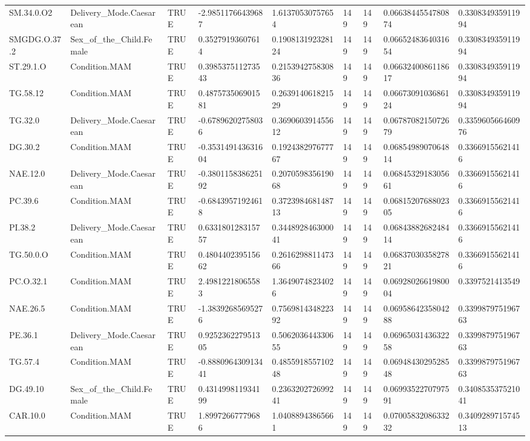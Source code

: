 \begin{longtable}{lllllllll}
SM.34.0.O2 & Delivery\_Mode.Caesarean & TRUE & -2.98511766439687 & 1.61370530757654 & 149 & 149 & 0.0663844554780874 & 0.330834935911994 \\
SMGDG.O.37.2 & Sex\_of\_the\_Child.Female & TRUE & 0.35279193607614 & 0.190813192328124 & 149 & 149 & 0.0665248364031654 & 0.330834935911994 \\
ST.29.1.O & Condition.MAM & TRUE & 0.398537511273543 & 0.215394275830836 & 149 & 149 & 0.0663240086118617 & 0.330834935911994 \\
TG.58.12 & Condition.MAM & TRUE & 0.487573506901581 & 0.263914061821529 & 149 & 149 & 0.0667309103686124 & 0.330834935911994 \\
TG.32.0 & Delivery\_Mode.Caesarean & TRUE & -0.67896202758036 & 0.369060391455612 & 149 & 149 & 0.0678708215072679 & 0.335960566460976 \\
DG.30.2 & Condition.MAM & TRUE & -0.353149143631604 & 0.192438297677767 & 149 & 149 & 0.0685498907064814 & 0.33669155621416 \\
NAE.12.0 & Delivery\_Mode.Caesarean & TRUE & -0.380115838625192 & 0.207059835619068 & 149 & 149 & 0.0684532918305661 & 0.33669155621416 \\
PC.39.6 & Condition.MAM & TRUE & -0.68439571924618 & 0.372398468148713 & 149 & 149 & 0.0681520768802305 & 0.33669155621416 \\
PI.38.2 & Delivery\_Mode.Caesarean & TRUE & 0.633180128315757 & 0.344892846300041 & 149 & 149 & 0.0684388268248414 & 0.33669155621416 \\
TG.50.0.O & Condition.MAM & TRUE & 0.480440239515662 & 0.261629881147366 & 149 & 149 & 0.0683703035827821 & 0.33669155621416 \\
PC.O.32.1 & Condition.MAM & TRUE & 2.49812218065583 & 1.36490748234026 & 149 & 149 & 0.0692802661980004 & 0.3397521413549 \\
NAE.26.5 & Condition.MAM & TRUE & -1.38392685695276 & 0.756981434822392 & 149 & 149 & 0.0695864235804288 & 0.339987975196763 \\
PE.36.1 & Delivery\_Mode.Caesarean & TRUE & 0.925236227951305 & 0.506203644330655 & 149 & 149 & 0.0696503143632258 & 0.339987975196763 \\
TG.57.4 & Condition.MAM & TRUE & -0.888096430913441 & 0.485591855710248 & 149 & 149 & 0.0694843029528548 & 0.339987975196763 \\
DG.49.10 & Sex\_of\_the\_Child.Female & TRUE & 0.431499811934199 & 0.236320272699241 & 149 & 149 & 0.0699352270797591 & 0.340853537521041 \\
CAR.10.0 & Condition.MAM & TRUE & 1.89972667779686 & 1.04088943865661 & 149 & 149 & 0.0700583208633232 & 0.340928971574513 \\

\end{longtable}
